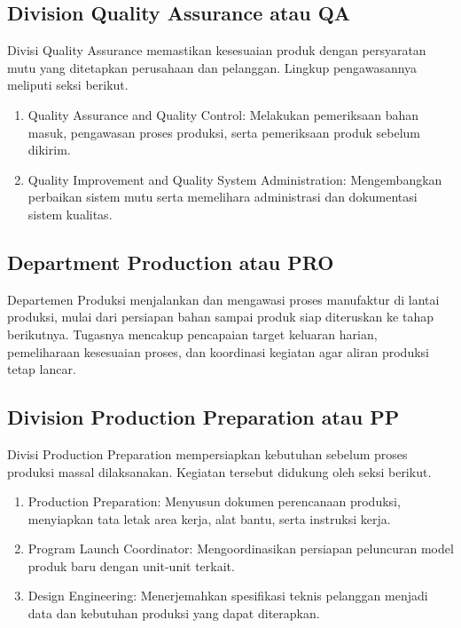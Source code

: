 \subsection{Division Quality Assurance atau QA}

Divisi Quality Assurance memastikan kesesuaian produk dengan persyaratan mutu yang ditetapkan perusahaan dan pelanggan. Lingkup pengawasannya meliputi seksi berikut.

\begin{enumerate}[leftmargin=*,itemsep=2pt]
\item Quality Assurance and Quality Control: Melakukan pemeriksaan bahan masuk, pengawasan proses produksi, serta pemeriksaan produk sebelum dikirim.

\item Quality Improvement and Quality System Administration: Mengembangkan perbaikan sistem mutu serta memelihara administrasi dan dokumentasi sistem kualitas.

\end{enumerate}

\subsection{Department Production atau PRO}

Departemen Produksi menjalankan dan mengawasi proses manufaktur di lantai produksi, mulai dari persiapan bahan sampai produk siap diteruskan ke tahap berikutnya. Tugasnya mencakup pencapaian target keluaran harian, pemeliharaan kesesuaian proses, dan koordinasi kegiatan agar aliran produksi tetap lancar.

\subsection{Division Production Preparation atau PP}

Divisi Production Preparation mempersiapkan kebutuhan sebelum proses produksi massal dilaksanakan. Kegiatan tersebut didukung oleh seksi berikut.

\begin{enumerate}[leftmargin=*,itemsep=2pt]
\item Production Preparation: Menyusun dokumen perencanaan produksi, menyiapkan tata letak area kerja, alat bantu, serta instruksi kerja.

\item Program Launch Coordinator: Mengoordinasikan persiapan peluncuran model produk baru dengan unit-unit terkait.

\item Design Engineering: Menerjemahkan spesifikasi teknis pelanggan menjadi data dan kebutuhan produksi yang dapat diterapkan.

\end{enumerate}

